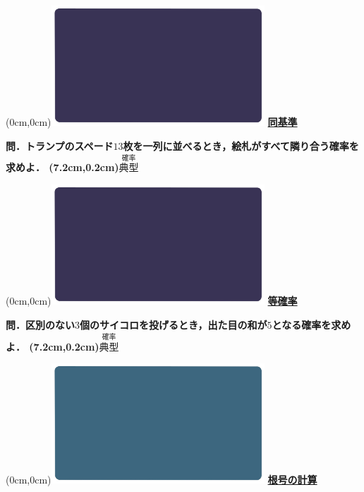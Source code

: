 \documentclass[10pt,
fleqn,
dvipdfmx,
uplatex
]{jsarticle}
\begin{document}
\newpage



\at(0cm,0cm){\includegraphics[width=8cm,bb=0 0 1920 1080]{./youtube/thumbnails/templates/smart_background/確率.jpeg}}
{\color{orange}\bf\boldmath\huge\underline{同基準}}\vspace{0.3zw}

\LARGE 
\bf\boldmath 問．トランプのスペード${13}$枚を一列に並べるとき，絵札がすべて隣り合う確率を求めよ．
\at(7.2cm,0.2cm){\small\color{bradorange}$\overset{\text{確率}}{\text{典型}}$}


\newpage



\at(0cm,0cm){\includegraphics[width=8cm,bb=0 0 1920 1080]{./youtube/thumbnails/templates/smart_background/確率.jpeg}}
{\color{orange}\bf\boldmath\huge\underline{等確率}}\vspace{0.3zw}

\LARGE 
\bf\boldmath 問．区別のない$3$個のサイコロを投げるとき，出た目の和が$5$となる確率を求めよ．
\at(7.2cm,0.2cm){\small\color{bradorange}$\overset{\text{確率}}{\text{典型}}$}


\newpage



\at(0cm,0cm){\includegraphics[width=8cm,bb=0 0 1920 1080]{./youtube/thumbnails/templates/smart_background/数I数と式.jpeg}}
{\color{orange}\bf\boldmath\huge\underline{根号の計算}}\vspace{0.3zw}
\end{document}
